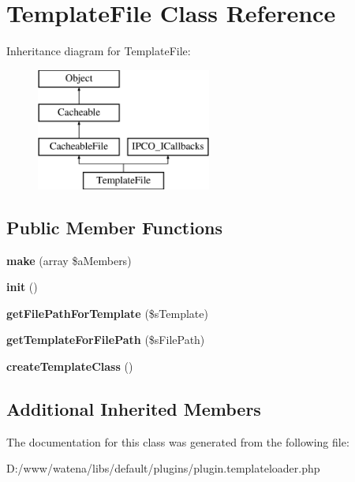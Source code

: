 \hypertarget{class_template_file}{\section{Template\-File Class Reference}
\label{class_template_file}
}
Inheritance diagram for Template\-File\-:\begin{figure}[H]
\begin{center}
\leavevmode
\includegraphics[height=4.000000cm]{class_template_file}
\end{center}
\end{figure}
\subsection*{Public Member Functions}
\begin{DoxyCompactItemize}
\item 
\hypertarget{class_template_file_aa36f590b760493569c9c9349915ba6a2}{{\bfseries make} (array \$a\-Members)}\label{class_template_file_aa36f590b760493569c9c9349915ba6a2}

\item 
\hypertarget{class_template_file_a478b5bc21a13b8557a981ba723af8f33}{{\bfseries init} ()}\label{class_template_file_a478b5bc21a13b8557a981ba723af8f33}

\item 
\hypertarget{class_template_file_a9b8d7aa0b8464b97897333ec08931aea}{{\bfseries get\-File\-Path\-For\-Template} (\$s\-Template)}\label{class_template_file_a9b8d7aa0b8464b97897333ec08931aea}

\item 
\hypertarget{class_template_file_ad367c5f03c60d95d48c531c5e9ea858b}{{\bfseries get\-Template\-For\-File\-Path} (\$s\-File\-Path)}\label{class_template_file_ad367c5f03c60d95d48c531c5e9ea858b}

\item 
\hypertarget{class_template_file_ad6ded534b21256f5c40f02d19504bcaf}{{\bfseries create\-Template\-Class} ()}\label{class_template_file_ad6ded534b21256f5c40f02d19504bcaf}

\end{DoxyCompactItemize}
\subsection*{Additional Inherited Members}


The documentation for this class was generated from the following file\-:\begin{DoxyCompactItemize}
\item 
D\-:/www/watena/libs/default/plugins/plugin.\-templateloader.\-php\end{DoxyCompactItemize}
